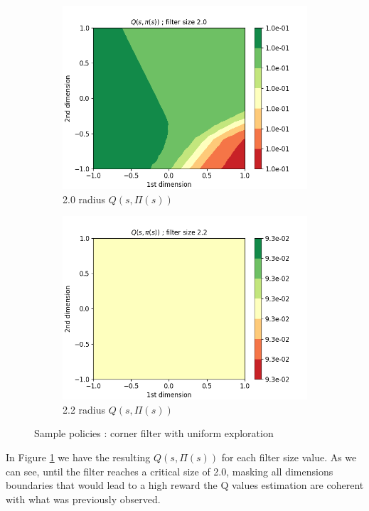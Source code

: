 \documentclass{article}
\begin{document}
\begin{figure}[H]
\begin{subfigure}[b]{0.3\linewidth}
    \includegraphics[width=\linewidth]{Study_2/2.3/visualizations/Q_contour_2_0.png}
      \caption{2.0 radius $Q(s, \Pi(s))$}
  \end{subfigure}
    \begin{subfigure}[b]{0.3\linewidth}
    \includegraphics[width=\linewidth]{Study_2/2.3/visualizations/Q_contour_2_2.png}
      \caption{2.2 radius $Q(s, \Pi(s))$}
  \end{subfigure}
   \caption{Sample policies : corner filter with uniform exploration}
   \label{fig:corner_contour_uniform}
\end{figure}

In Figure \ref{fig:corner_contour_uniform} we have the resulting $Q(s, \Pi(s))$ for each filter size value. As we can see, until the filter reaches a critical size of 2.0, masking all dimensions boundaries that would lead to a high reward the Q values estimation are coherent with what was previously observed. 
\end{document}
